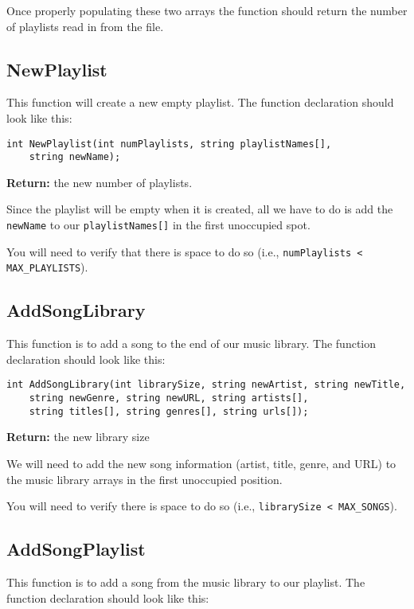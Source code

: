 Once properly populating these two arrays the function should return the number of playlists read in from the file.

\subsection{NewPlaylist\star}

This function will create a new empty playlist. The function declaration should look like this:

\begin{verbatim}
int NewPlaylist(int numPlaylists, string playlistNames[], 
    string newName);
\end{verbatim}

\textbf{Return:} the new number of playlists.

Since the playlist will be empty when it is created, all we have to do is add the \texttt{newName} to our \texttt{playlistNames[]} in the first unoccupied spot.

You will need to verify that there is space to do so (i.e., \texttt{numPlaylists < MAX_PLAYLISTS}).

\subsection{AddSongLibrary \star}
This function is to add a song to the end of our music library. The function declaration should look like this:

\begin{verbatim}
int AddSongLibrary(int librarySize, string newArtist, string newTitle, 
    string newGenre, string newURL, string artists[], 
    string titles[], string genres[], string urls[]);
\end{verbatim}

\textbf{Return:} the new library size

We will need to add the new song information (artist, title, genre, and URL) to the music library arrays in the first unoccupied position. 

You will need to verify there is space to do so (i.e., \texttt{librarySize < MAX_SONGS}).

\subsection{AddSongPlaylist \star \star}
This function is to add a song from the music library to our playlist. The function declaration should look like this:

